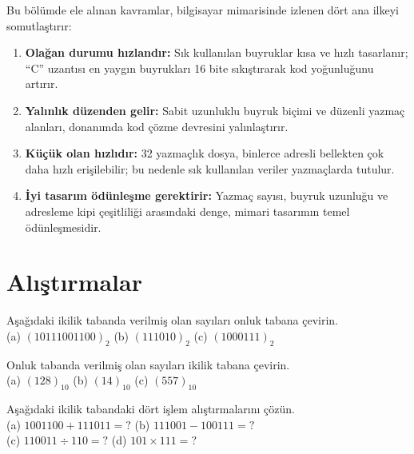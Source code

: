 Bu bölümde ele alınan kavramlar, bilgisayar mimarisinde izlenen dört ana ilkeyi somutlaştırır:
\begin{sloppypar}
\begin{enumerate}
\item \textbf{Olağan durumu hızlandır:} Sık kullanılan buyruklar kısa ve hızlı tasarlanır; ``C'' uzantısı en yaygın buyrukları 16 bite sıkıştırarak kod yoğunluğunu artırır.
\item \textbf{Yalınlık düzenden gelir:} Sabit uzunluklu buyruk biçimi ve düzenli yazmaç alanları, donanımda kod çözme devresini yalınlaştırır.
\item \textbf{Küçük olan hızlıdır:} 32 yazmaçlık dosya, binlerce adresli bellekten çok daha hızlı erişilebilir; bu nedenle sık kullanılan veriler yazmaçlarda tutulur.
\item \textbf{İyi tasarım ödünleşme gerektirir:} Yazmaç sayısı, buyruk uzunluğu ve adresleme kipi çeşitliliği arasındaki denge, mimari tasarımın temel ödünleşmesidir.
\end{enumerate}

\end{sloppypar}

\section*{Alıştırmalar}

\begin{alistirma}[\kolay]
Aşağıdaki ikilik tabanda verilmiş olan sayıları onluk tabana çevirin.\\
(a) $(10111001100)_2$ \quad (b) $(111010)_2$ \quad (c) $(1000111)_2$
\end{alistirma}

\begin{alistirma}[\kolay]
Onluk tabanda verilmiş olan sayıları ikilik tabana çevirin.\\
(a) $(128)_{10}$ \quad (b) $(14)_{10}$ \quad (c) $(557)_{10}$
\end{alistirma}

\begin{alistirma}[\orta]
Aşağıdaki ikilik tabandaki dört işlem alıştırmalarını çözün.\\
(a) $1001100 + 111011 = ?$ \quad (b) $111001 - 100111 = ?$\\
(c) $110011 \div 110 = ?$ \quad (d) $101 \times 111 = ?$
\end{alistirma}

